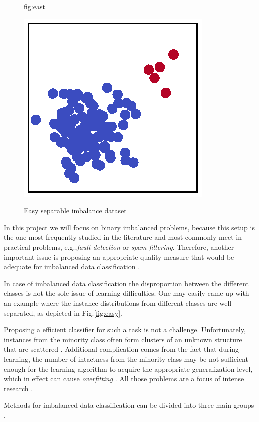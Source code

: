 \documentclass[pmlr]{jmlr}
\begin{document}
\begin{figure}[!h]
\floatconts
  {fig:east}
  {\caption{Easy separable imbalance dataset}}
  {\includegraphics[clip=true, trim = 11 11 11 11, width=0.25\linewidth]{figures/easy}}
\end{figure}

In this project we will focus on binary imbalanced problems, because this setup is the one most frequently studied in the literature and most commonly meet in practical problems, e.g.,\textit{fault detection} or \textit{spam filtering}. Therefore, another important issue is proposing an appropriate quality measure that would be adequate for imbalanced data classification \cite{Elazmeh:2006}.

In case of imbalanced data classification the disproportion between the different classes is not the sole issue of learning difficulties. One may easily came up with an example where the instance distributions from different classes are well-separated, as depicted in Fig.\ref{fig:easy}.

Proposing a efficient classifier for such a task is not a challenge. Unfortunately, instances from the minority class often form clusters of an unknown structure that are scattered \cite{Napierala:2012}. Additional complication comes from the fact that during learning, the number of intactness from the minority class may be not sufficient enough for the learning algorithm to acquire the appropriate generalization level, which in effect can cause \emph{overfitting} \cite{Chen:2008}. All those problems are a focus of intense research \cite{Chawla:2002,Bunkhumpornpat:2009,Kubat:1997}.

Methods for imbalanced data classification can be divided into three main groups \cite{Lopez:2012}.
\end{document}
